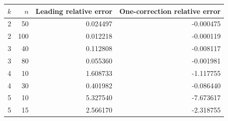 \begin{tabular}{@{}rrrr@{}}\toprule
$k$ & $n$ & Leading relative error & One-correction relative error \\ \midrule
2 & 50 & 0.024497 & -0.000475 \\
2 & 100 & 0.012218 & -0.000119 \\
3 & 40 & 0.112808 & -0.008117 \\
3 & 80 & 0.055360 & -0.001981 \\
4 & 10 & 1.608733 & -1.117755 \\
4 & 30 & 0.401982 & -0.086440 \\
5 & 10 & 5.327540 & -7.673617 \\
5 & 15 & 2.566170 & -2.318755 \\
\bottomrule\end{tabular}
